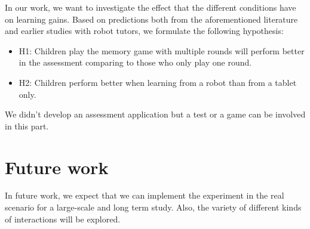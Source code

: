\documentclass[a4paper, 12pt]{article}
\begin{document}
In our work, we want to investigate the effect that the different conditions have on learning gains. Based on predictions both from the aforementioned literature and earlier studies with robot tutors, we formulate the following hypothesis:
\begin{itemize}
\item H1: Children play the memory game with multiple rounds will perform better in the assessment comparing to those who only play one round.
\item H2: Children perform better when learning from a robot than from a tablet only.
\end{itemize}

We didn't develop an assessment application but a test or a game can be involved in this part.

\section{Future work}

In future work, we expect that we can implement the experiment in the real scenario for a large-scale and long term study. Also, the variety of different kinds of interactions will
be explored.







\end{document}
